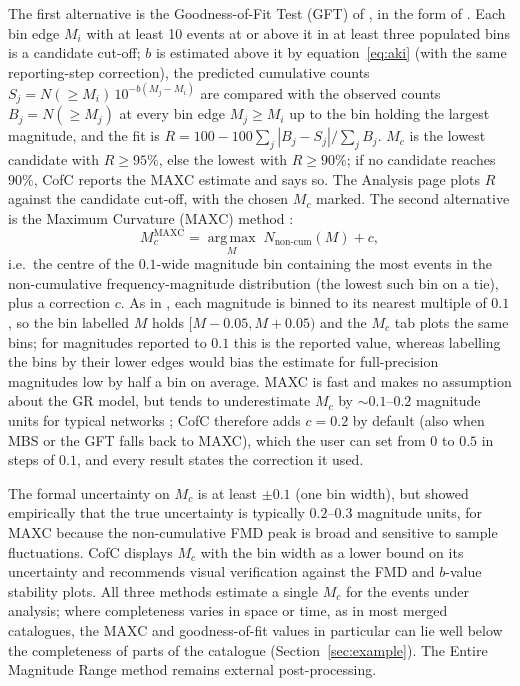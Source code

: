 \documentclass[12pt]{article}
\begin{document}
The first alternative is the Goodness-of-Fit Test (GFT) of \citet{wiemer2000},
in the form of \citet{woessner2005}.  Each bin edge $M_i$ with
at least 10 events at or above it in at least three populated bins is a
candidate cut-off; $b$ is estimated above it by equation~\eqref{eq:aki} (with the
same reporting-step correction), the predicted cumulative counts
$S_j = N(\geq M_i)\,10^{-b(M_j - M_i)}$ are compared with the observed counts
$B_j = N(\geq M_j)$ at every bin edge $M_j \geq M_i$ up to the bin holding the
largest magnitude, and the fit is
$R = 100 - 100\sum_j |B_j - S_j| / \sum_j B_j$.  $M_c$ is the lowest candidate
with $R \geq 95\%$, else the lowest with $R \geq 90\%$; if no candidate reaches
$90\%$, CofC reports the MAXC estimate and says so.  The Analysis page plots $R$
against the candidate cut-off, with the chosen $M_c$ marked.  The second
alternative is the Maximum Curvature (MAXC) method \citep{wiemer2000}:
\begin{equation}
  M_c^{\mathrm{MAXC}} = \operatorname*{arg\,max}_{M}
    \; N_{\mathrm{non\text{-}cum}}(M) + c,
  \label{eq:maxc}
\end{equation}
i.e.\ the centre of the $0.1$-wide magnitude bin containing the most events in
the non-cumulative frequency-magnitude distribution (the lowest such bin on a tie),
plus a correction $c$.  As in \citet{wiemer2000}, each magnitude is binned to its
nearest multiple of $0.1$, so the bin labelled $M$ holds $[M - 0.05, M + 0.05)$
and the $M_c$ tab plots the same bins; for magnitudes reported to $0.1$ this is
the reported value, whereas labelling the bins by their lower edges would bias
the estimate for full-precision magnitudes low by half a bin on average.  MAXC is
fast and makes no assumption about the GR model, but tends to underestimate $M_c$
by $\sim 0.1$--$0.2$ magnitude units for typical networks \citep{woessner2005};
CofC therefore adds $c = 0.2$ by default (also when MBS or the GFT falls back to
MAXC), which the user can set from $0$ to $0.5$ in steps of $0.1$, and every
result states the correction it used.

The formal uncertainty on $M_c$ is at least $\pm 0.1$ (one bin width), but
\citet{woessner2005} showed empirically that the true uncertainty is typically
$0.2$--$0.3$ magnitude units, for MAXC because the non-cumulative FMD peak is
broad and sensitive to sample fluctuations.  CofC displays $M_c$ with the bin
width as a lower bound on its uncertainty and recommends visual verification
against the FMD and $b$-value stability plots.  All three methods estimate a
single $M_c$ for the events under analysis; where completeness varies in space or
time, as in most merged catalogues, the MAXC and goodness-of-fit values in
particular can lie well below the completeness of parts of the catalogue
(Section~\ref{sec:example}).  The Entire Magnitude Range method
\citep{woessner2005} remains external post-processing.
\end{document}
